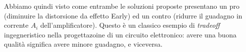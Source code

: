 \documentclass[a4paper,11pt]{article}
\begin{document}
Abbiamo quindi visto come entrambe le soluzioni proposte presentano un pro (diminuire la distorsione da effetto Early) ed un contro (ridurre il guadagno in corrente $A_i$ dell'amplificatore). Questo è un classico esempio di \textit{tradeoff} ingegneristico nella progettazoine di un circuito elettronico: avere una buona qualità significa avere minore guadagno, e viceversa.
\end{document}
